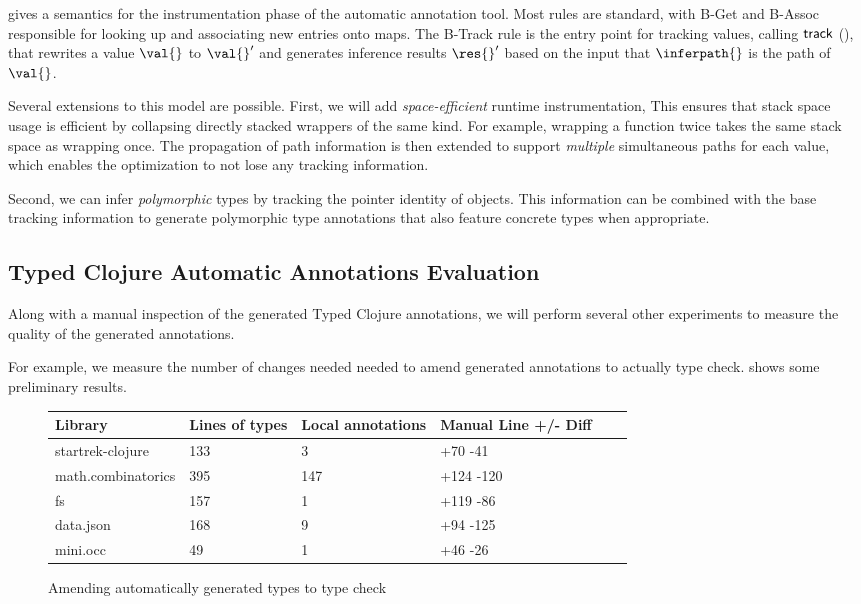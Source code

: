 \documentclass[9pt]{extarticle}
\begin{document}
 gives a semantics for the instrumentation
phase of the automatic annotation tool.
Most rules are standard, with B-Get and B-Assoc responsible for
looking up and associating new entries onto maps.
The B-Track rule is the entry point for tracking values,
calling $\mathsf{track}{}$ (), that
rewrites a value $\val{}$ to $\val{}'$ and generates inference
results $\res{}'$ based on the input that $\inferpath{}$
is the path of $\val{}$.

Several extensions to this model are possible.
First, we will add \emph{space-efficient} runtime instrumentation,
This ensures that stack space usage is efficient by collapsing
directly stacked wrappers of the same kind. For example, wrapping
a function twice takes the same stack space as wrapping once.
The propagation of path information is then extended to support
\emph{multiple} simultaneous paths for each value, which enables
the optimization to not lose any tracking information.

Second, we can infer \emph{polymorphic} types by tracking
the pointer identity of objects. This information
can be combined with the base tracking information to generate
polymorphic type annotations that also feature concrete types
when appropriate.





\subsection{Typed Clojure Automatic Annotations Evaluation}

Along with a manual inspection of the generated Typed Clojure annotations,
we will perform several other experiments to measure the quality of the
generated annotations.

For example, we measure the number of changes needed
needed to amend generated annotations to actually type check.
 shows some preliminary results.

\begin{figure*}
\begin{tabular}{| l | l | l | l | l | l |}
  Library            & Lines of types  & Local annotations & Manual Line +/- Diff \\
  \hline
  startrek-clojure   & 133             & 3                 & +70 -41 \\
  math.combinatorics & 395             & 147               & +124 -120\\
  fs                 & 157             & 1                 & +119 -86\\
  data.json          & 168             & 9                 & +94 -125 \\
  mini.occ           & 49              & 1                 & +46 -26\\
\end{tabular}
\caption{Amending automatically generated types to type check}
  \label{infer:amending}
\end{figure*}
\end{document}
